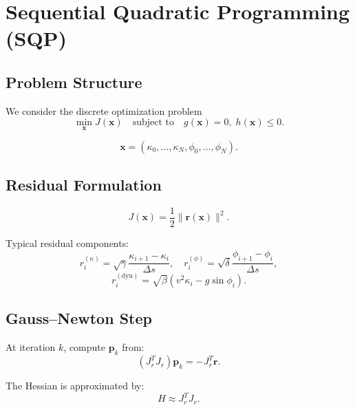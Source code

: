 
\section{Sequential Quadratic Programming (SQP)}

\subsection{Problem Structure}

We consider the discrete optimization problem
\[
\min_{\mathbf{x}} J(\mathbf{x})
\quad \text{subject to} \quad
g(\mathbf{x}) = 0,\;
h(\mathbf{x}) \le 0.
\]

\begin{definition}
\[
\mathbf{x} =
(\kappa_0,\dots,\kappa_N,\phi_0,\dots,\phi_N).
\]
\end{definition}

\subsection{Residual Formulation}

\begin{definition}
\[
J(\mathbf{x}) = \frac{1}{2} \| \mathbf{r}(\mathbf{x}) \|^2.
\]
\end{definition}

Typical residual components:
\[
r_i^{(\kappa)} = \sqrt{\gamma}
\frac{\kappa_{i+1}-\kappa_i}{\Delta s},
\quad
r_i^{(\phi)} = \sqrt{\delta}
\frac{\phi_{i+1}-\phi_i}{\Delta s},
\]
\[
r_i^{(\mathrm{dyn})}
=
\sqrt{\beta}
(v^2 \kappa_i - g \sin\phi_i).
\]

\subsection{Gauss--Newton Step}

\begin{definition}
At iteration \(k\), compute \(\mathbf{p}_k\) from:
\[
(J_r^T J_r)\mathbf{p}_k = -J_r^T \mathbf{r}.
\]
\end{definition}

The Hessian is approximated by:
\[
H \approx J_r^T J_r.
\]

